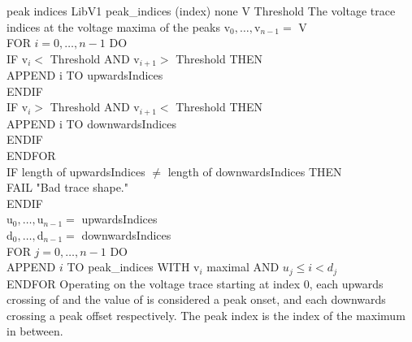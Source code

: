 \begin{efeature}
  {peak indices}
  {LibV1}
  {peak\_indices}
  {(index)}
  {none}
  {V}
  {Threshold}
  {The voltage trace indices at the voltage maxima of the peaks}
  {
  v$_0, \ldots, $v$_{n-1} =$ V \\
  FOR $i = 0, \dots, n - 1$ DO \+ \\
    IF v$_i <$ Threshold AND v$_{i+1} >$ Threshold THEN \+ \\
      APPEND i TO upwardsIndices \- \\
    ENDIF \\
    IF v$_i >$ Threshold AND v$_{i+1} <$ Threshold THEN \+ \\
      APPEND i TO downwardsIndices \- \\
    ENDIF \- \\
  ENDFOR \\
  IF length of upwardsIndices $\neq$ length of downwardsIndices THEN \+ \\
    FAIL "Bad trace shape." \- \\
  ENDIF \\
  u$_0, \ldots, $u$_{n-1} =$ upwardsIndices \\
  d$_0, \ldots, $d$_{n-1} =$ downwardsIndices \\
  FOR $j = 0, \ldots, n-1$ DO \+ \\
    APPEND $i$ TO peak\_indices WITH v$_i$ maximal AND $u_j \le i < d_j$ \- \\
  ENDFOR
  }
  Operating on the voltage trace starting at index 0, each upwards crossing of  and the value of  is considered a peak onset, and each downwards crossing a peak offset respectively. 
  The peak index is the index of the maximum in between.
\end{efeature}

